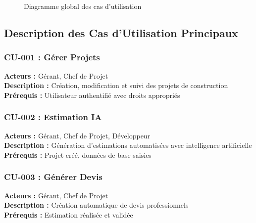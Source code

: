 \begin{figure}[H]
\caption{Diagramme global des cas d'utilisation}
\label{fig:cas_utilisation_global}
\end{figure}

\subsection{Description des Cas d'Utilisation Principaux}

\subsubsection{CU-001 : Gérer Projets}
\textbf{Acteurs :} Gérant, Chef de Projet \\
\textbf{Description :} Création, modification et suivi des projets de construction \\
\textbf{Prérequis :} Utilisateur authentifié avec droits appropriés

\subsubsection{CU-002 : Estimation IA}
\textbf{Acteurs :} Gérant, Chef de Projet, Développeur \\
\textbf{Description :} Génération d'estimations automatisées avec intelligence artificielle \\
\textbf{Prérequis :} Projet créé, données de base saisies

\subsubsection{CU-003 : Générer Devis}
\textbf{Acteurs :} Gérant, Chef de Projet \\
\textbf{Description :} Création automatique de devis professionnels \\
\textbf{Prérequis :} Estimation réalisée et validée

